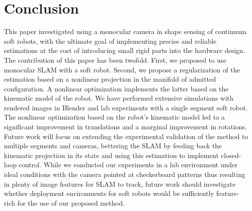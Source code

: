 \section{Conclusion}
\label{sec:srslam:conclusions}

This paper investigated using a monocular camera in shape sensing of continuum soft robots, with the ultimate goal of implementing precise and reliable estimations at the cost of introducing small rigid parts into the hardware design. The contribution of this paper has been twofold. First, we proposed to use monocular SLAM with a soft robot. Second, we propose a regularization of the estimation based on a nonlinear projection in the manifold of admitted configuration. A nonlinear optimization implements the latter based on the kinematic model of the robot. We have performed extensive simulations with rendered images in Blender and lab experiments with a single segment soft robot. The nonlinear optimization based on the robot's kinematic model led to a significant improvement in translations and a marginal improvement in rotations. 
Future work will focus on extending the experimental validation of the method to multiple segments and cameras, bettering the SLAM by feeding back the kinematic projection in its state and using this estimation to implement closed-loop control.
While we conducted our experiments in a lab environment under ideal conditions with the camera pointed at checkerboard patterns thus resulting in plenty of image features for \gls{SLAM} to track, future work should investigate whether deployment environments for soft robots would be sufficiently feature-rich for the use of our proposed method.